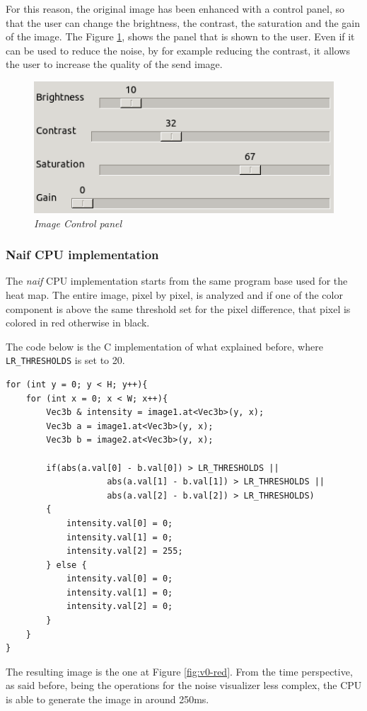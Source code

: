 \documentclass[paper=a4, fontsize=10pt]{scrartcl}	%
\begin{document}
	For this reason, the original image has been enhanced with a control panel, so that the user can change the brightness, the contrast, the saturation and the gain of the image. The Figure \ref{fig:controls}, shows the panel that is shown to the user. Even if it can be used to reduce the noise, by for example reducing the contrast, it allows the user to increase the quality of the send image.
	\begin{figure}[H]
		\centering
		\includegraphics[width=0.33\linewidth]{images/heatmap/controls}
		\caption{\textit{Image Control panel}}
		\label{fig:controls}
	\end{figure}
	
	\subsubsection{Naif CPU implementation}
	The \textit{naif} CPU implementation starts from the same program base used for the heat map. The entire image, pixel by pixel, is analyzed and if one of the color component is above the same threshold set for the pixel difference, that pixel is colored in red otherwise in black.
	
	The code below is the C implementation of what explained before, where \texttt{LR\_THRESHOLDS} is set to 20.
\begin{lstlisting}[style=CStyle]
for (int y = 0; y < H; y++){
	for (int x = 0; x < W; x++){
		Vec3b & intensity = image1.at<Vec3b>(y, x);
		Vec3b a = image1.at<Vec3b>(y, x);
		Vec3b b = image2.at<Vec3b>(y, x);
		
		if(abs(a.val[0] - b.val[0]) > LR_THRESHOLDS ||
					abs(a.val[1] - b.val[1]) > LR_THRESHOLDS ||
					abs(a.val[2] - b.val[2]) > LR_THRESHOLDS)
		{
			intensity.val[0] = 0;
			intensity.val[1] = 0;
			intensity.val[2] = 255;
		} else {
			intensity.val[0] = 0;
			intensity.val[1] = 0;
			intensity.val[2] = 0;
		}
	}
}\end{lstlisting}
	The resulting image is the one at Figure \ref{fig:v0-red}. From the time perspective, as said before, being the operations for the noise visualizer less complex, the CPU is able to generate the image in around 250ms.
	
\end{document}
